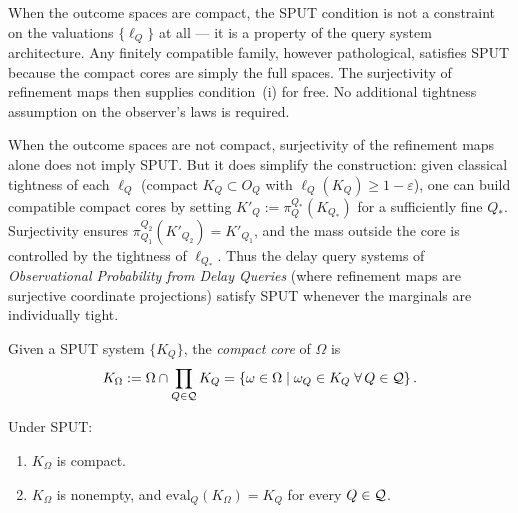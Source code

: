 \begin{remark}
When the outcome spaces are compact, the SPUT condition is not a
constraint on the valuations $\{\ell_Q\}$ at all — it is a property
of the query system architecture.  Any finitely compatible family,
however pathological, satisfies SPUT because the compact cores are
simply the full spaces.  The surjectivity of refinement maps then
supplies condition~(i) for free.  No additional tightness assumption
on the observer's laws is required.
\end{remark}

\begin{remark}
When the outcome spaces are not compact, surjectivity of the
refinement maps alone does not imply SPUT.  But it does simplify the
construction: given classical tightness of each $\ell_Q$ (compact
$K_Q \subset O_Q$ with $\ell_Q(K_Q) \geq 1 - \varepsilon$), one
can build compatible compact cores by setting $K'_Q :=
\pi^{Q_*}_Q(K_{Q_*})$ for a sufficiently fine $Q_*$.  Surjectivity
ensures $\pi^{Q_2}_{Q_1}(K'_{Q_2}) = K'_{Q_1}$, and the mass
outside the core is controlled by the tightness of $\ell_{Q_*}$.
Thus the delay query systems of \emph{Observational Probability from
Delay Queries} (where refinement maps are surjective coordinate
projections) satisfy SPUT whenever the marginals are individually
tight.
\end{remark}

\begin{definition}
Given a SPUT system $\{K_Q\}$, the \emph{compact core} of $\Omega$
is
\[
K_\Omega
:=
\Omega \cap \prod_{Q \in \mathcal{Q}} K_Q
=
\left\{
\omega \in \Omega
\;\middle|\;
\omega_Q \in K_Q \;\forall\, Q \in \mathcal{Q}
\right\}.
\]
\end{definition}

\begin{proposition}
\label{prop:compact-core}
Under SPUT:
\begin{enumerate}[label=(\roman*)]
\item $K_\Omega$ is compact.
\item $K_\Omega$ is nonempty, and $\mathrm{eval}_Q(K_\Omega) = K_Q$
  for every $Q \in \mathcal{Q}$.
\end{enumerate}
\end{proposition}

